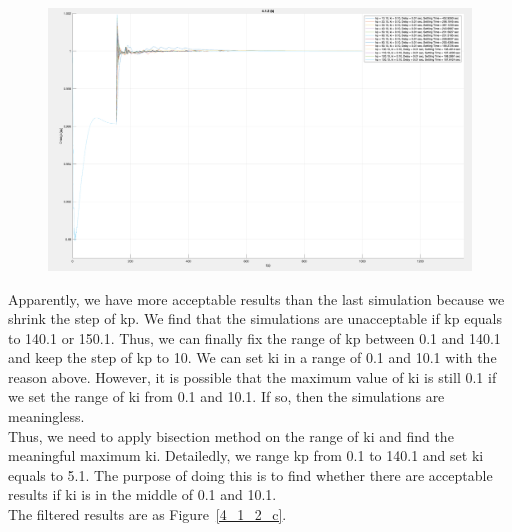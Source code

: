 \begin{figure}[htbp]
\centering
\includegraphics[width = .819\textwidth]{figure/4_1_2_b.png}
\end{figure}


Apparently, we have more acceptable results than the last simulation because we shrink the step of kp. We find that the simulations are unacceptable if kp equals to 140.1 or 150.1. Thus, we can finally fix the range of kp between 0.1 and 140.1 and keep the step of kp to 10. We can set ki in a range of 0.1 and 10.1 with the reason above. However, it is possible that the maximum value of ki is still 0.1 if we set the range of ki from 0.1 and 10.1. If so, then the simulations are meaningless. \\

Thus, we need to apply bisection method on the range of ki and find the meaningful maximum ki. Detailedly, we range kp from 0.1 to 140.1 and set ki equals to 5.1. The purpose of doing this is to find whether there are acceptable results if ki is in the middle of 0.1 and 10.1.\\

The filtered results are as Figure~\ref{4_1_2_c}. \\ 

